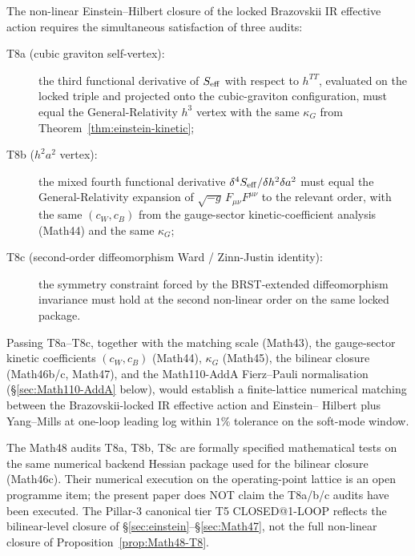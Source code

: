 \begin{proposition}
\label{prop:Math48-T8}
The non-linear Einstein--Hilbert closure of the locked Brazovskii
IR effective action requires the simultaneous satisfaction of three
audits:
\begin{description}
\item[T8a (cubic graviton self-vertex):] the third functional
derivative of $S_{\rm eff}$ with respect to $h^{TT}$, evaluated on
the locked triple and projected onto the cubic-graviton
configuration, must equal the General-Relativity $h^3$ vertex with
the same $\kappa_G$ from
Theorem~\ref{thm:einstein-kinetic};
\item[T8b ($h^2 a^2$ vertex):] the mixed fourth functional
derivative $\delta^4 S_{\rm eff} / \delta h^2 \delta a^2$ must
equal the General-Relativity expansion of $\sqrt{-g}\, F_{\mu\nu}
F^{\mu\nu}$ to the relevant order, with the same $(c_W, c_B)$ from
the gauge-sector kinetic-coefficient analysis (Math44) and the same
$\kappa_G$;
\item[T8c (second-order diffeomorphism Ward / Zinn-Justin
identity):] the symmetry constraint forced by the BRST-extended
diffeomorphism invariance must hold at the second non-linear order
on the same locked package.
\end{description}
Passing T8a--T8c, together with the matching scale (Math43), the
gauge-sector kinetic coefficients $(c_W, c_B)$ (Math44),
$\kappa_G$ (Math45), the bilinear closure (Math46b/c, Math47), and
the Math110-AddA Fierz--Pauli normalisation (\S\ref{sec:Math110-AddA}
below), would establish a finite-lattice numerical matching
between the Brazovskii-locked IR effective action and Einstein--
Hilbert plus Yang--Mills at one-loop leading log within $1\%$
tolerance on the soft-mode window.
\end{proposition}

\begin{remark}
\label{rem:audit-execution}
The Math48 audits T8a, T8b, T8c are formally specified
mathematical tests on the same numerical backend Hessian package
used for the bilinear closure (Math46c). Their numerical execution
on the operating-point lattice is an open programme item; the
present paper does NOT claim the T8a/b/c audits have been
executed. The Pillar-3 canonical tier T5 CLOSED@1-LOOP reflects
the bilinear-level closure of \S\ref{sec:einstein}--\S\ref{sec:Math47},
not the full non-linear closure of Proposition~\ref{prop:Math48-T8}.
\end{remark}

